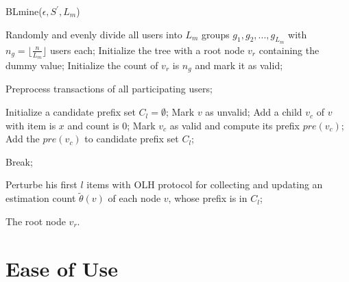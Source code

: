 \documentclass[conference]{IEEEtran}
\begin{document}
\begin{algorithm}[htbp]
  \caption{BLmine($\epsilon,S^{\prime},L_m$)}
  \label{alg BSmine}
  \begin{algorithmic}[1]
  \STATE Randomly and evenly divide all users into $L_m$ groups $g_1,g_2,...,g_{L_m}$ with $n_g = \lfloor \frac{n}{L_m} \rfloor$ users each;
  \STATE Initialize the tree with a root node $v_r$ containing the dummy value;
  \STATE Initialize the count of $v_r$ is $n_g$ and mark it as valid;

  \STATE Preprocess transactions of all participating users;

      \STATE Initialize a candidate prefix set $C_l = \emptyset$;
      \STATE Mark $v$ as unvalid;
        \STATE Add a child $v_c$ of $v$ with item is $x$ and count is 0;
        \STATE Mark $v_c$ as valid and compute its prefix $pre(v_c)$;
        \STATE Add the $pre(v_c)$ to candidate prefix set $C_l$;
      \ENDFOR
    \ENDWHILE
 
    \STATE Break;
    \ENDIF

    \STATE Perturbe his first $l$ items with OLH protocol for collecting and updating an estimation count $\tilde{\theta}(v)$ of each node $v$, whose prefix is in $C_l$;
    \ENDFOR

  \ENDFOR

  \RETURN The root node $v_r$.
  
  \end{algorithmic}
\end{algorithm}




\section{Ease of Use}
\end{document}
